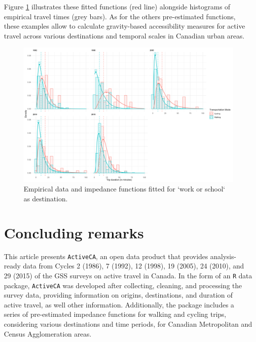 \documentclass[Royal,times,sageh]{sagej}
\begin{document}
Figure \ref{fig:figure-03} illustrates these fitted functions (red line)
alongside histograms of empirical travel times (grey bars). As for the
others pre-estimated functions, these examples allow to calculate
gravity-based accessibility measures for active travel across various
destinations and temporal scales in Canadian urban areas.

\begin{figure}

{\centering \includegraphics[width=1\linewidth]{Manuscript-figures/impf_Work or school} 

}

\caption{Empirical data and impedance functions fitted for `work or school` as destination.}\label{fig:figure-03}
\end{figure}

\hypertarget{concluding-remarks}{%
\section{Concluding remarks}\label{concluding-remarks}}

This article presents \texttt{ActiveCA}, an open data product that
provides analysis-ready data from Cycles 2 (1986), 7 (1992), 12 (1998),
19 (2005), 24 (2010), and 29 (2015) of the GSS surveys on active travel
in Canada. In the form of an \texttt{R} data package, \texttt{ActiveCA}
was developed after collecting, cleaning, and processing the survey
data, providing information on origins, destinations, and duration of
active travel, as well other information. Additionally, the package
includes a series of pre-estimated impedance functions for walking and
cycling trips, considering various destinations and time periods, for
Canadian Metropolitan and Census Agglomeration areas.
\end{document}
